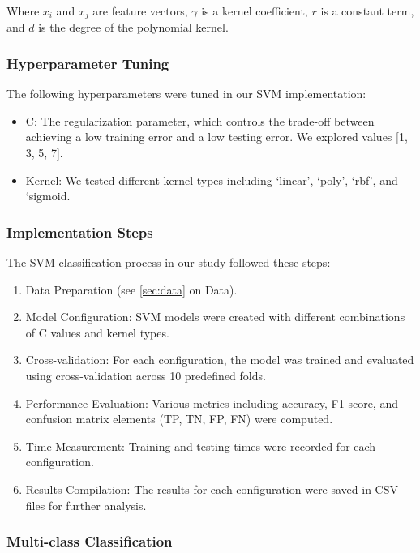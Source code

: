 Where $x_i$ and $x_j$ are feature vectors, $\gamma$ is a kernel coefficient, $r$ is a constant term, and $d$ is the degree of the polynomial kernel.

\subsubsection{Hyperparameter Tuning}

The following hyperparameters were tuned in our SVM implementation:

\begin{itemize}
    \item C: The regularization parameter, which controls the trade-off between achieving a low training error and a low testing error. We explored values [1, 3, 5, 7].
    \item Kernel: We tested different kernel types including `linear', `poly', `rbf', and `sigmoid.
\end{itemize}

\subsubsection{Implementation Steps}

The SVM classification process in our study followed these steps:

\begin{enumerate}
    \item Data Preparation (see \autoref{sec:data} on Data).
    \item Model Configuration: SVM models were created with different combinations of C values and kernel types.
    \item Cross-validation: For each configuration, the model was trained and evaluated using cross-validation across 10 predefined folds.
    \item Performance Evaluation: Various metrics including accuracy, F1 score, and confusion matrix elements (TP, TN, FP, FN) were computed.
    \item Time Measurement: Training and testing times were recorded for each configuration.
    \item Results Compilation: The results for each configuration were saved in CSV files for further analysis.
\end{enumerate}

\subsubsection{Multi-class Classification}

